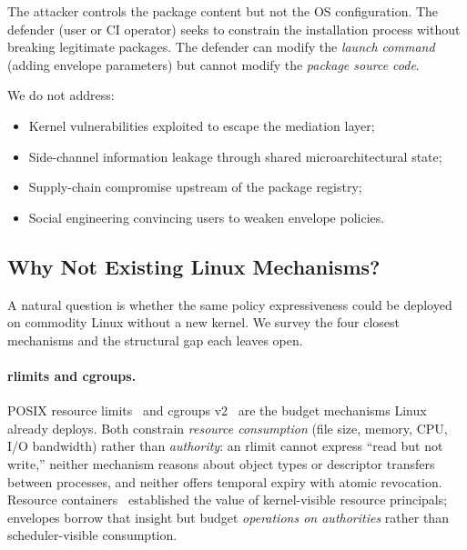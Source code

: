\documentclass[letterpaper,twocolumn,10pt]{article}
\begin{document}
The attacker controls the package content but not the OS configuration.
The defender (user or CI operator) seeks to constrain the installation
process without breaking legitimate packages.  The defender can modify
the \emph{launch command} (adding envelope parameters) but cannot
modify the \emph{package source code}.

We do not address:
\begin{itemize}
\item Kernel vulnerabilities exploited to escape the mediation layer;
\item Side-channel information leakage through shared microarchitectural state;
\item Supply-chain compromise upstream of the package registry;
\item Social engineering convincing users to weaken envelope policies.
\end{itemize}

\subsection{Why Not Existing Linux Mechanisms?}
\label{sec:positioning}

A natural question is whether the same policy expressiveness could be
deployed on commodity Linux without a new kernel.  We survey the four
closest mechanisms and the structural gap each leaves open.

\paragraph{rlimits and cgroups.}
POSIX resource limits~\cite{setrlimit2017} and cgroups
v2~\cite{cgroupsv2} are the budget mechanisms Linux already deploys.
Both constrain \emph{resource consumption} (file size, memory, CPU,
I/O bandwidth) rather than \emph{authority}: an rlimit cannot express
``read but not write,'' neither mechanism reasons about object types or
descriptor transfers between processes, and neither offers temporal
expiry with atomic revocation.  Resource containers~\cite{banga1999rc}
established the value of kernel-visible resource principals; envelopes
borrow that insight but budget \emph{operations on authorities} rather
than scheduler-visible consumption.
\end{document}
